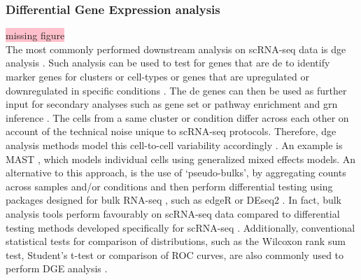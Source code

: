 \subsubsection{Differential Gene Expression analysis}
 \colorbox{pink}{missing figure}\\
The most commonly performed downstream analysis on scRNA-seq data is \gls{dge} analysis \textbf{\cite{das_comprehensive_2021}}. Such analysis can be used to test for genes that are \gls{de} to identify marker genes for clusters or cell-types or genes that are upregulated or downregulated in specific conditions \textbf{\cite{lueckenmalte_d_current_2019,heumos_best_2023,das_comprehensive_2021}}. The \gls{de} genes can then be used as further input for secondary analyses such as gene set or pathway enrichment and \gls{grn} inference \textbf{\cite{das_comprehensive_2021}}. The cells from a same cluster or condition differ across each other on account of the technical noise unique to scRNA-seq protocols. Therefore, \gls{dge} analysis methods model this cell-to-cell variability accordingly \textbf{\cite{lueckenmalte_d_current_2019,das_comprehensive_2021}}. An example is MAST \textbf{\cite{finak_mast_2015}}, which models individual cells using generalized mixed effects models. An alternative to this approach, is the use of ‘pseudo-bulks’, by aggregating counts across samples and/or conditions and then perform differential testing using packages designed for bulk RNA-seq \textbf{\cite{lueckenmalte_d_current_2019,heumos_best_2023}}, such as edgeR \textbf{\cite{robinson_edger_2009}} or DEseq2 \textbf{\cite{love_moderated_2014}}. In fact, bulk analysis tools perform favourably on scRNA-seq data compared to differential testing methods developed specifically for scRNA-seq \textbf{\cite{das_comprehensive_2021,squair_confronting_2021,van_den_berge_observation_2018,soneson_bias_2018}}. Additionally, conventional statistical tests for comparison of distributions, such as the Wilcoxon rank sum test, Student's t-test or comparison of ROC curves, are also commonly used to perform DGE analysis \textbf{\cite{butler_integrating_2018}}.\\\\
